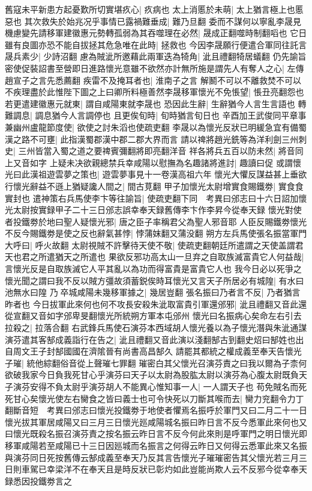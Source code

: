 舊寇未平新患方起憂歎所切實堪疚心|{
	疚病也}
太上消慝於未萌|{
	太上猶言極上也慝惡也}
其次救失於始兆况乎事情已露禍難垂成|{
	難乃旦翻}
委而不謀何以寧亂李晟見機慮變先請移軍建徽惠元勢轉孤弱為其吞噬理在必然|{
	晟成正翻噬時制翻㗖也}
它日雖有良圖亦恐不能自拔拯其危急唯在此時|{
	拯救也}
今因李晟願行便遣合軍同往託言晟兵素少|{
	少詩沼翻}
慮為賊泚所邀藉此兩軍迭為犄角|{
	泚且禮翻犄居蟻翻}
仍先諭旨密使促裝詔書至營即日進路懷光意雖不欲然亦計無所施是謂先人有奪人之心|{
	左傳趙宣子之言先悉薦翻}
疾雷不及掩耳者也|{
	淮南子之言}
解鬭不可以不離救焚不可以不疾理盡於此惟陛下圖之上曰卿所料極善然李晟移軍懷光不免悵望|{
	悵丑亮翻怨也}
若更遣建徽惠元就東|{
	謂自咸陽東就李晟也}
恐因此生辭|{
	生辭猶今人言生言語也}
轉難調息|{
	調息猶今人言調停也}
且更俟旬時|{
	旬時猶言旬日也}
辛酉加王武俊同平章事兼幽州盧龍節度使|{
	欲使之討朱滔也使疏吏翻}
李晟以為懷光反狀已明緩急宜有備蜀漢之路不可壅|{
	此指漢蜀郡漢中郡二郡大界而言}
請以禆將趙光銑等為洋利劍三州刺史|{
	三州皆當入蜀之道之要禆賓彌翻將即亮翻洋音}
祥各將兵五百以防未然|{
	將音同上又音如字}
上疑未决欲親總禁兵幸咸陽以慰撫為名趣諸將進討|{
	趣讀曰促}
或謂懷光曰此漢祖遊雲夢之策也|{
	遊雲夢事見十一卷漢高祖六年}
懷光大懼反謀益甚上垂欲行懷光辭益不遜上猶疑讒人間之|{
	間古莧翻}
甲子加懷光太尉增實食賜鐵劵|{
	實食食實封也}
遣神策右兵馬使李卞等往諭旨|{
	使疏吏翻下同　考異曰邠志曰十六日詔加懷光太尉按實録甲子二十三日邠志誤幸奉天録舊傳李卞作李昇今從奉天録}
懷光對使者投鐵劵於地曰聖人疑懷光邪|{
	唐之臣子率稱君父為聖人邪音耶}
人臣反賜鐵劵懷光不反今賜鐵劵是使之反也辭氣甚悖|{
	悖蒲妺翻又蒲没翻}
朔方左兵馬使張名振當軍門大呼曰|{
	呼火故翻}
太尉視賊不許擊待天使不敬|{
	使疏吏翻朝廷所遣謂之天使盖謂君天也君之所遣猶天之所遣也}
果欲反邪功高太山一旦弃之自取族滅富貴它人何益哉|{
	言懷光反是自取族滅它人平其亂以為功而得富貴是富貴它人也}
我今日必以死爭之懷光聞之謂曰我不反以賊方彊故須蓄鋭俟時耳懷光又言天子所居必有城隍|{
	有水曰池無水曰隍}
乃卒城咸陽未幾移軍據之|{
	幾居豈翻}
張名振曰乃者言不反|{
	乃者猶言昨者也}
今日拔軍此來何也何不攻長安殺朱泚取富貴引軍還邠邪|{
	泚且禮翻又音此還從宣翻又音如字邠卑旻翻懷光所統朔方軍本屯邠州}
懷光曰名振病心矣命左右引去拉殺之|{
	拉落合翻}
右武鋒兵馬使石演芬本西域胡人懷光養以為子懷光潛與朱泚通謀演芬遣其客郜成義詣行在告之|{
	泚且禮翻又音此演以淺翻郜古到翻史炤曰郜姓也出自周文王子封郜國國在濟隂晉有尚書高昌郜久}
請罷其都統之權成義至奉天告懷光子璀|{
	統他綜翻俗音從上聲璀七罪翻}
璀密白其父懷光召演芬責之曰我以爾為子柰何欲破我家今日負我死甘心乎演芬曰天子以太尉為股肱太尉以演芬為心腹太尉既負天子演芬安得不負太尉乎演芬胡人不能異心惟知事一人|{
	一人謂天子也}
苟免賊名而死死甘心矣懷光使左右臠食之皆曰義士也可令快死以刀斷其喉而去|{
	臠力兖翻令力丁翻斷音短　考異曰邠志曰懷光投鐵劵于地使者懼焉名振呼於軍門又曰二月二十一日懷光拔其軍居咸陽又曰三月三日懷光廵咸陽城名振曰昨日言不反今悉軍此來何也又曰懷光既殺名振召演芬責之按名振云昨日言不反今何此來則是呼軍門之明日懷光即移軍咸陽若至咸陽已十三日因廵城而名振言之何得云昨日又何得云悉軍此來又名振與演芬同日死按舊傳云郜成義至奉天乃反其言告懷光子璀璀密告其父懷光若三月三日則車駕已幸梁洋不在奉天且是時反狀已彰灼如此豈能尚欺人云不反邪今從幸奉天録悉因投鐵劵言之}
